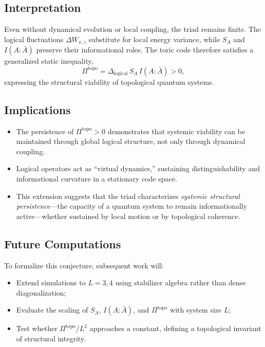 \documentclass[10pt]{article}
\begin{document}
\subsection*{Interpretation}

Even without dynamical evolution or local coupling, the triad remains finite. 
The logical fluctuations $\Delta W_{x,z}$ substitute for local energy variance, while 
$S_A$ and $I(A:\bar{A})$ preserve their informational roles. 
The toric code therefore satisfies a generalized static inequality,
\begin{equation}
\Pi^{\mathrm{topo}} 
   = \Delta_{\mathrm{logical}} \, S_A \, I(A:\bar{A}) > 0,
\end{equation}
expressing the structural viability of topological quantum systems.

\subsection*{Implications}

\begin{itemize}
    \item The persistence of $\Pi^{\mathrm{topo}}>0$ demonstrates that 
          systemic viability can be maintained through global logical structure, 
          not only through dynamical coupling.
    \item Logical operators act as ``virtual dynamics,'' sustaining distinguishability 
          and informational curvature in a stationary code space.
    \item This extension suggests that the triad characterizes 
          \emph{systemic structural persistence}---the capacity of a quantum system 
          to remain informationally active---whether sustained by local motion 
          or by topological coherence.
\end{itemize}

\subsection*{Future Computations}

To formalize this conjecture, subsequent work will:
\begin{itemize}
    \item Extend simulations to $L=3,4$ using stabilizer algebra rather than dense diagonalization;
    \item Evaluate the scaling of $S_A$, $I(A:\bar{A})$, and $\Pi^{\mathrm{topo}}$ with system size $L$;
    \item Test whether $\Pi^{\mathrm{topo}}/L^2$ approaches a constant, defining a topological invariant 
          of structural integrity.
\end{itemize}
\end{document}
